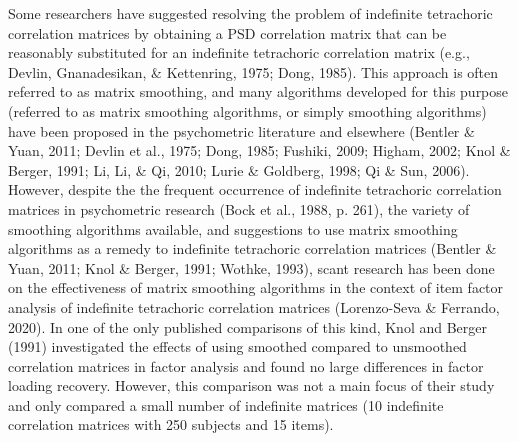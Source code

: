 \documentclass[
  english,
  man]{apa6}
\begin{document}
Some researchers have suggested resolving the problem of indefinite tetrachoric correlation matrices by obtaining a PSD correlation matrix that can be reasonably substituted for an indefinite tetrachoric correlation matrix (e.g., Devlin, Gnanadesikan, \& Kettenring, 1975; Dong, 1985). This approach is often referred to as matrix smoothing, and many algorithms developed for this purpose (referred to as matrix smoothing algorithms, or simply smoothing algorithms) have been proposed in the psychometric literature and elsewhere (Bentler \& Yuan, 2011; Devlin et al., 1975; Dong, 1985; Fushiki, 2009; Higham, 2002; Knol \& Berger, 1991; Li, Li, \& Qi, 2010; Lurie \& Goldberg, 1998; Qi \& Sun, 2006). However, despite the the frequent occurrence of indefinite tetrachoric correlation matrices in psychometric research (Bock et al., 1988, p. 261), the variety of smoothing algorithms available, and suggestions to use matrix smoothing algorithms as a remedy to indefinite tetrachoric correlation matrices (Bentler \& Yuan, 2011; Knol \& Berger, 1991; Wothke, 1993), scant research has been done on the effectiveness of matrix smoothing algorithms in the context of item factor analysis of indefinite tetrachoric correlation matrices (Lorenzo-Seva \& Ferrando, 2020). In one of the only published comparisons of this kind, Knol and Berger (1991) investigated the effects of using smoothed compared to unsmoothed correlation matrices in factor analysis and found no large differences in factor loading recovery. However, this comparison was not a main focus of their study and only compared a small number of indefinite matrices (10 indefinite correlation matrices with 250 subjects and 15 items).
\end{document}
